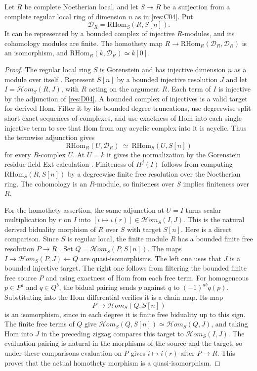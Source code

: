 \begin{theorem}\label{res:D05}
Let $R$ be complete Noetherian local, and let $S\twoheadrightarrow R$ be a surjection
from a complete regular local ring of dimension $n$ as in \ref{res:C04}.
Put
\[
          \mathcal D_R=\mathrm{RHom}_S(R,S[n]).
\]
It can be represented by a bounded complex of injective $R$-modules,
and its cohomology modules are finite. The homothety map
$R\longrightarrow\mathrm{RHom}_R(\mathcal D_R,\mathcal D_R)$ is an
isomorphism, and $\mathrm{RHom}_R(k,\mathcal D_R)\simeq k[0]$.
\end{theorem}
\begin{proof}
The regular local ring $S$ is Gorenstein and has injective
dimension $n$ as a module over itself \cite[GC-06--GC-07]{core}.
Represent $S[n]$ by a bounded injective resolution $J$ and let
$I=\mathcal H om_S(R,J)$, with $R$ acting on the argument $R$.
Each term of $I$ is injective by the adjunction of \ref{res:D04}.
A bounded complex of injectives is a valid target for derived
Hom. Filter it by its bounded degree truncations, use degreewise
split short exact sequences of complexes, and use exactness of
Hom into each single injective term to see that Hom from any
acyclic complex into it is acyclic. Thus the termwise adjunction
gives
\[
        \mathrm{RHom}_R(U,\mathcal D_R)
        \ \simeq\ \mathrm{RHom}_S(U,S[n])
\]
for every $R$-complex $U$. At $U=k$ it gives the normalization by
the Gorenstein residue-field Ext calculation \cite[GC-06]{core}.
Finiteness of $H^j(I)$ follows from computing $\mathrm{RHom}_S(R,S[n])$
by a degreewise finite free resolution over the Noetherian ring.
The cohomology is an $R$-module, so finiteness over $S$ implies
finiteness over $R$.

For the homothety assertion, the same adjunction at $U=I$
turns scalar multiplication by $r$ on $I$ into
$[i\mapsto i(r)]\in\mathcal H om_S(I,J)$. This is the natural
derived biduality morphism of $R$ over $S$ with target $S[n]$.
Here is a direct comparison. Since $S$ is regular local, the
finite module $R$ has a bounded finite free resolution
$P\to R$ \cite[CM-12]{core}. Set
$Q=\mathcal H om_S(P,S[n])$. The maps
$I\to\mathcal H om_S(P,J)\leftarrow Q$ are quasi-isomorphisms.
The left one uses that $J$ is a bounded injective target.
The right one follows from filtering the bounded finite free
source $P$ and using exactness of Hom from each free term.
For homogeneous $p\in P^a$ and $q\in Q^b$, the bidual pairing
sends $p$ against $q$ to $(-1)^{ab}q(p)$. Substituting into the
Hom differential verifies it is a chain map. Its map
\[
          P\longrightarrow \mathcal H om_S(Q,S[n])
\]
is an isomorphism, since in each degree it is finite free
biduality up to this sign. The finite free terms of $Q$ give
$\mathcal H om_S(Q,S[n])\simeq \mathcal H om_S(Q,J)$, and taking
Hom into $J$ in the preceding zigzag compares this target to
$\mathcal H om_S(I,J)$. The evaluation pairing is natural in
the morphisms of the source and the target, so under these
comparisons evaluation on $P$ gives $i\mapsto i(r)$ after
$P\to R$. This proves that the actual homothety morphism is
a quasi-isomorphism.
\end{proof}


